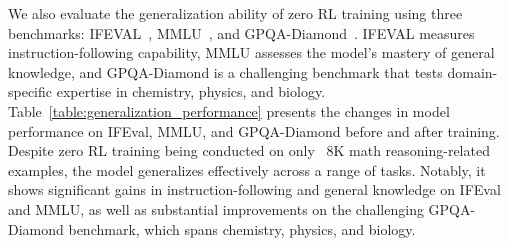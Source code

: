 We also evaluate the generalization ability of zero RL training using three benchmarks: IFEVAL~\citep{zhou2023instruction}, MMLU~\citep{hendrycks2020measuring}, and GPQA-Diamond~\citep{rein2024gpqa}. IFEVAL measures instruction-following capability, MMLU assesses the model's mastery of general knowledge, and GPQA-Diamond is a challenging benchmark that tests domain-specific expertise in chemistry, physics, and biology. Table~\ref{table:generalization_performance} presents the changes in model performance on IFEval, MMLU, and GPQA-Diamond before and after training. Despite zero RL training being conducted on only ~8K math reasoning-related examples, the model generalizes effectively across a range of tasks. Notably, it shows significant gains in instruction-following and general knowledge on IFEval and MMLU, as well as substantial improvements on the challenging GPQA-Diamond benchmark, which spans chemistry, physics, and biology.

